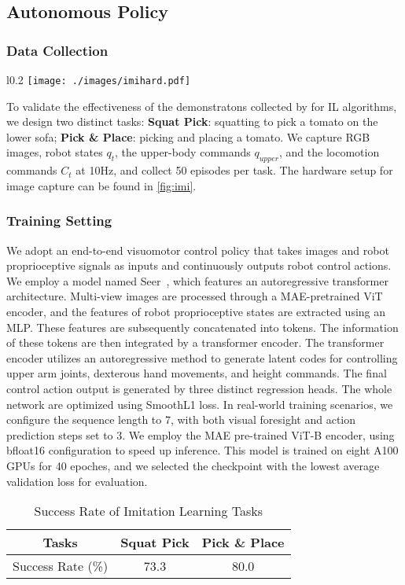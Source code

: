 \subsection{Autonomous Policy}

\subsubsection{Data Collection}
\begin{wrapfigure}{l}{0.2\textwidth}
  \centering
  \texttt{[image: ./images/imihard.pdf]}
  \caption{Hardware Setup for Imitation Learning}
  \label{fig:imi}
\end{wrapfigure}
To validate the effectiveness of the demonstratons collected by \ourshort for IL algorithms, we design two distinct tasks: \textbf{Squat Pick}: squatting to pick a tomato on the lower sofa; \textbf{Pick \& Place}: picking and placing a tomato. We capture RGB images, robot states $q_t$, the upper-body commands $q_{upper}$, and the locomotion commands $C_t$ at 10Hz, and collect 50 episodes per task. The hardware setup for image capture can be found in \cref{fig:imi}.

\subsubsection{Training Setting}
\label{sec:iltraining}
We adopt an end-to-end visuomotor control policy that takes images and robot proprioceptive signals as inputs and continuously outputs robot control actions.
%
We employ a model named Seer~\cite{tian2024predictive}, which features an autoregressive transformer architecture.
%
Multi-view images are processed through a MAE-pretrained ViT encoder, and the features of robot proprioceptive states are extracted using an MLP. These features are subsequently concatenated into tokens. The information of these tokens are then integrated by a transformer encoder. The transformer encoder utilizes an autoregressive method to generate latent codes for controlling upper arm joints, dexterous hand movements, and height commands. The final control action output is generated by three distinct regression heads. The whole network are optimized using SmoothL1 loss.
%
In real-world training scenarios, we configure the sequence length to 7, with both visual foresight and action prediction steps set to 3. We employ the MAE pre-trained ViT-B encoder, using bfloat16 configuration to speed up inference. This model is trained on eight A100 GPUs for 40 epoches, and we selected the checkpoint with the lowest average validation loss for evaluation.
%
\begin{table}[!ht]
    \centering
    \caption{Success Rate of Imitation Learning Tasks}
    \begin{tabular}{c|cc}
        \toprule
        \textbf {Tasks} & Squat Pick & Pick \& Place\\
        \midrule
        Success Rate (\%)  & 73.3 & 80.0\\
        \bottomrule
    \end{tabular}
    \label{tab:imi}
\end{table}
